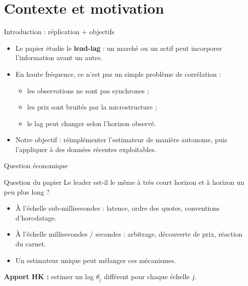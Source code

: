 \documentclass[10pt,aspectratio=169]{beamer}
\begin{document}
\section{Contexte et motivation}

\begin{frame}{Introduction : réplication + objectifs}
  \begin{itemize}
    \item Le papier étudie le \textbf{lead-lag} : un marché ou un actif peut incorporer l'information avant un autre.
    \item En haute fréquence, ce n'est pas un simple problème de corrélation :
      \begin{itemize}
        \item les observations ne sont pas synchrones ;
        \item les prix sont bruités par la microstructure ;
        \item le lag peut changer selon l'horizon observé.
      \end{itemize}
    \item Notre objectif : réimplémenter l'estimateur de manière autonome, puis l'appliquer à des données récentes exploitables.
  \end{itemize}
\end{frame}

\begin{frame}{Question économique}
  \begin{block}{Question du papier}
    Le leader est-il le même à très court horizon et à horizon un peu plus long ?
  \end{block}

  \vspace{0.25cm}
  \begin{itemize}
    \item À l'échelle sub-millisecondes : latence, ordre des quotes, conventions d'horodatage.
    \item À l'échelle millisecondes / secondes : arbitrage, découverte de prix, réaction du carnet.
    \item Un estimateur unique peut mélanger ces mécanismes.
  \end{itemize}

  \vspace{0.25cm}
  \textbf{Apport HK :} estimer un lag \(\theta_j\) différent pour chaque échelle \(j\).
\end{frame}
\end{document}
